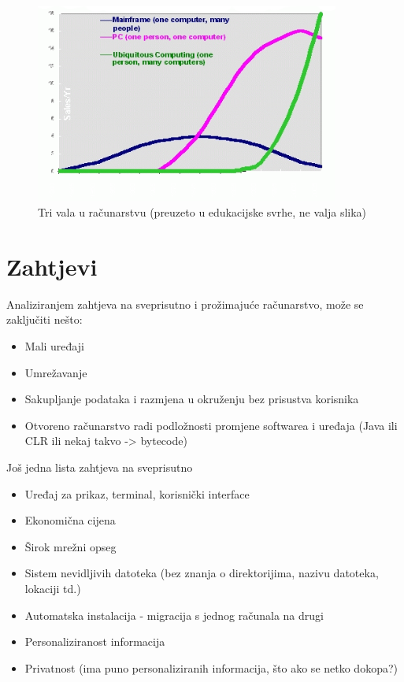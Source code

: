 \documentclass[times, utf8, diplomski, numeric]{fer}
\begin{document}
\begin{figure}[!htb]
	\centering
	\includegraphics[width=10cm]{images/majortrends.png}
	\caption{Tri vala u računarstvu (preuzeto u edukacijske svrhe, ne valja slika)}
	\label{fig:majortrends}
\end{figure}

\section{Zahtjevi}
Analiziranjem zahtjeva na sveprisutno i prožimajuće računarstvo, može se
zaključiti nešto:
\begin{itemize}
  \item Mali uređaji
  \item Umrežavanje
  \item Sakupljanje podataka i razmjena u okruženju bez prisustva korisnika
  \item Otvoreno računarstvo radi podložnosti promjene softwarea i uređaja
  (Java ili CLR ili nekaj takvo -> bytecode)
\end{itemize}

Još jedna lista zahtjeva na sveprisutno
\begin{itemize}
  \item Uređaj za prikaz, terminal, korisnički interface
  \item Ekonomična cijena
  \item Širok mrežni opseg
  \item Sistem nevidljivih datoteka (bez znanja o direktorijima, nazivu
  datoteka, lokaciji td.)
  \item Automatska instalacija - migracija s jednog računala na drugi
  \item Personaliziranost informacija
  \item Privatnost (ima puno personaliziranih informacija, što ako se netko
  dokopa?)
\end{itemize}
\end{document}
